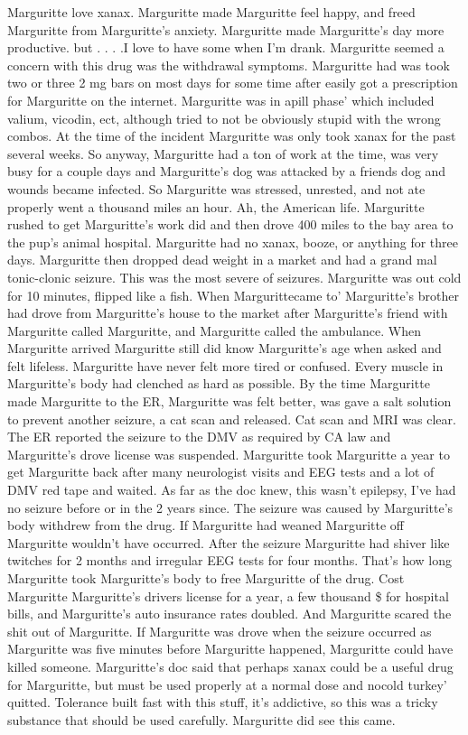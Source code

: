 \documentclass[12pt]{book}
\begin{document}
Marguritte love xanax. Marguritte made Marguritte feel happy, and freed Marguritte from Marguritte's anxiety. Marguritte made Marguritte's day more productive. but . . .  .I love to have some when I'm drank. Marguritte seemed a concern with this drug was the withdrawal symptoms. Marguritte had was took two or three 2 mg bars on most days for some time after easily got a prescription for Marguritte on the internet. Marguritte was in apill phase' which included valium, vicodin, ect, although tried to not be obviously stupid with the wrong combos. At the time of the incident Marguritte was only took xanax for the past several weeks. So anyway, Marguritte had a ton of work at the time, was very busy for a couple days and Marguritte's dog was attacked by a friends dog and wounds became infected. So Marguritte was stressed, unrested, and not ate properly went a thousand miles an hour. Ah, the American life. Marguritte rushed to get Marguritte's work did and then drove 400 miles to the bay area to the pup's animal hospital. Marguritte had no xanax, booze, or anything for three days. Marguritte then dropped dead weight in a market and had a grand mal tonic-clonic seizure. This was the most severe of seizures. Marguritte was out cold for 10 minutes, flipped like a fish. When Margurittecame to' Marguritte's brother had drove from Marguritte's house to the market after Marguritte's friend with Marguritte called Marguritte, and Marguritte called the ambulance. When Marguritte arrived Marguritte still did know Marguritte's age when asked and felt lifeless. Marguritte have never felt more tired or confused. Every muscle in Marguritte's body had clenched as hard as possible. By the time Marguritte made Marguritte to the ER, Marguritte was felt better, was gave a salt solution to prevent another seizure, a cat scan and released. Cat scan and MRI was clear. The ER reported the seizure to the DMV as required by CA law and Marguritte's drove license was suspended. Marguritte took Marguritte a year to get Marguritte back after many neurologist visits and EEG tests and a lot of DMV red tape and waited. As far as the doc knew, this wasn't epilepsy, I've had no seizure before or in the 2 years since. The seizure was caused by Marguritte's body withdrew from the drug. If Marguritte had weaned Marguritte off Marguritte wouldn't have occurred. After the seizure Marguritte had shiver like twitches for 2 months and irregular EEG tests for four months. That's how long Marguritte took Marguritte's body to free Marguritte of the drug. Cost Marguritte Marguritte's drivers license for a year, a few thousand \$ for hospital bills, and Marguritte's auto insurance rates doubled. And Marguritte scared the shit out of Marguritte. If Marguritte was drove when the seizure occurred as Marguritte was five minutes before Marguritte happened, Marguritte could have killed someone. Marguritte's doc said that perhaps xanax could be a useful drug for Marguritte, but must be used properly at a normal dose and nocold turkey' quitted. Tolerance built fast with this stuff, it's addictive, so this was a tricky substance that should be used carefully. Marguritte did see this came.
\end{document}
